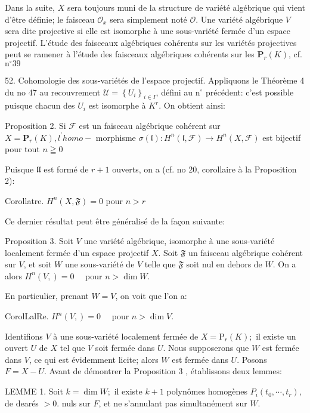 Dans la suite, $X$ sera toujours muni de la structure de variété algébrique qui vient d'être définie; le faisceau $\mathcal{O}_{x}$ sera simplement noté $\mathcal{O}$. Une variété algébrique $V$ sera dite projective si elle est isomorphe à une sous-variété fermée d'un espace projectif. L'étude des faisceaux algébriques cohérents sur les variétés projectives peut se ramener à l'étude des faisceaux algébriques cohérents sur les $\mathbf{P}_{r}(K)$, cf. $\mathrm{n}^{\circ} 39$

52. Cohomologie des sous-variétés de l'espace projectif. Appliquons le Théorème 4 du no 47 au recouvrement $\mathcal{U}=\left\{U_{i}\right\}_{i \in I}$, défini au $\mathrm{n}^{\circ}$ précédent: c'est possible puisque chacun des $U_{i}$ est isomorphe à $K^{r}$. On obtient ainsi:

Proposition 2. Si $\mathcal{F}$ est un faisceau algébrique cohérent sur $X=\mathbf{P}_{r}(K), l^{\prime} h o m o-$ morphisme $\sigma(\mathfrak{l}): H^{n}(\mathfrak{l}, \mathcal{F}) \rightarrow H^{n}(X, \mathcal{F})$ est bijectif pour tout $n \geqq 0$

Puisque $\mathfrak{l l}$ est formé de $r+1$ ouverts, on a (cf. no 20, corollaire à la Proposition 2):

Corollatre. $H^{n}(X, \mathfrak{F})=0$ pour $n>r$

Ce dernier résultat peut être généralisé de la façon suivante:

Proposition 3. Soit $V$ une variété algébrique, isomorphe à une sous-variété localement fermée d'un espace projectif $X .$ Soit $\mathfrak{F}$ un faisceau algébrique cohérent sur $V$, et soit $W$ une sous-variété de $V$ telle que $\mathfrak{F}$ soit nul en dehors de $W$. On a alors $H^{n}(V, \mathscr{})=0 \quad$ pour $n>\operatorname{dim} W$.

En particulier, prenant $W=V$, on voit que l'on a:

CorolLalRe. $H^{n}(V, \mathscr{})=0 \quad$ pour $n>\operatorname{dim} V$.

Identifions $V$ à une sous-variété localement fermée de $X=\mathrm{P}_{r}(K) ;$ il existe un ouvert $U$ de $X$ tel que $V$ soit fermée dans $U$. Nous supposerons que $W$ est fermée dans $V$, ce qui est évidemment licite; alors $W$ est fermée dans $U$. Posons $F=X-U$. Avant de démontrer la Proposition 3 , établissons deux lemmes:

LEMME 1. Soit $k=\operatorname{dim} W ;$ il existe $k+1$ polynômes homogènes $P_{i}\left(t_{0}, \cdots, t_{r}\right)$, de dearés $>0$. nuls sur $F$, et ne s'annulant pas simultanément sur $W$.

